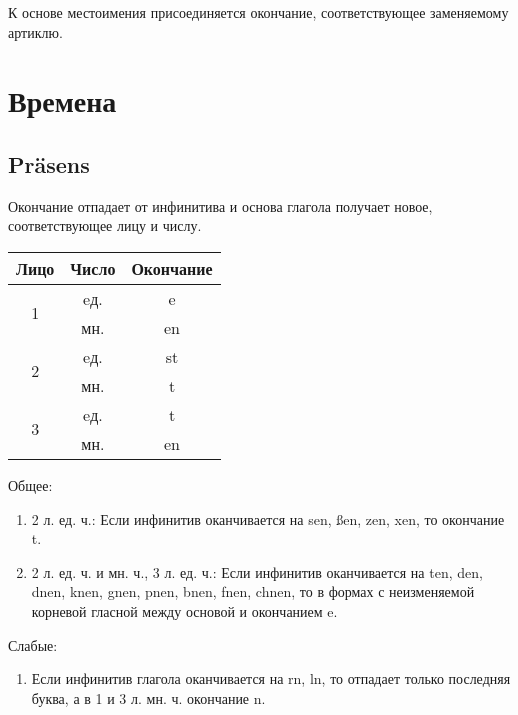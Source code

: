 \documentclass[oneside]{book}
\begin{document}
    К основе местоимения присоединяется окончание, соответствующее
    заменяемому артиклю.

    \chapter{Времена}
    \section{Pr\"asens}
    Окончание отпадает от инфинитива и основа глагола
    получает новое, соответствующее лицу и числу.

    \begin{center}
        \begin{tabular}{|c|c|c|}
            \hline
            Лицо               & Число & Окончание \\ \hline
            \multirow{2}{*}{1} & eд.   & e         \\ \cline{2-3}
                               & мн.   & en        \\ \hline
            \multirow{2}{*}{2} & eд.   & st        \\ \cline{2-3}
                               & мн.   & t         \\ \hline
            \multirow{2}{*}{3} & eд.   & t         \\ \cline{2-3}
                               & мн.   & en        \\ \hline
        \end{tabular}
    \end{center}

    Общее:
    \begin{enumerate}
        \item 2 л. ед. ч.: Если инфинитив оканчивается на sen, \ss en, zen, xen,
        то окончание t.

        \item 2 л. ед. ч. и мн. ч., 3 л. ед. ч.: Если инфинитив оканчивается на
        ten, den, dnen, knen, gnen, pnen, bnen, fnen, chnen, то в формах
        с неизменяемой корневой гласной между основой и окончанием e.
    \end{enumerate}

    Слабые:
    \begin{enumerate}
        \item Если инфинитив глагола оканчивается на rn, ln, то отпадает
        только последняя буква, а в 1 и 3 л. мн. ч. окончание n.
    \end{enumerate}
\end{document}

